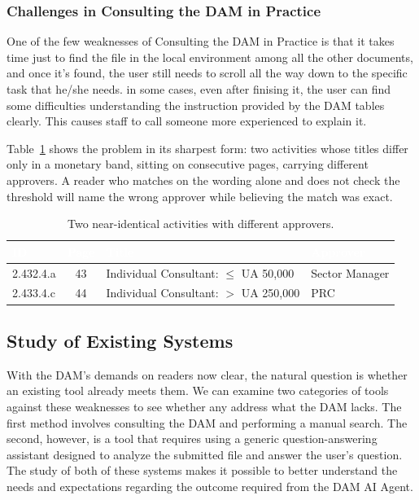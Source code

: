 \subsubsection{Challenges in Consulting the DAM in Practice}

One of the few weaknesses of Consulting the DAM in Practice is that it takes time just to find the file in the local environment among all the other documents, and once it's found, the user still needs to scroll all the way down to the specific task that he/she needs. in some cases, even after finising it, the user can find some difficulties understanding the instruction provided by the DAM tables clearly. This causes staff to call someone more experienced to explain it.

Table~\ref{tab:twintasks} shows the problem in its sharpest form: two activities whose titles differ only in a monetary band, sitting on consecutive pages, carrying different approvers. A reader who matches on the wording alone and does not check the threshold will name the wrong approver while believing the match was exact.

\begin{table}[h]
\centering
\caption{Two near-identical activities with different approvers.}
\label{tab:twintasks}
\begin{tabular}{|l|c|p{}|l|}
\hline
\rowcolor{myblue}
\textcolor{white}{\textbf{ID}} & \textcolor{white}{\textbf{Page}} & \textcolor{white}{\textbf{Title}} & \textcolor{white}{\textbf{Approver}} \\
\hline
2.432.4.a & 43 & Individual Consultant: $\leq$ UA 50,000 & Sector Manager \\
\hline
2.433.4.c & 44 & Individual Consultant: $>$ UA 250,000 & PRC \\
\hline
\end{tabular}
\end{table}


\subsection{Study of Existing Systems}
\label{sec:existingsystems}

With the DAM's demands on readers now clear, the natural question is whether an existing tool already meets them.  We can examine two categories of tools against these weaknesses to see whether any address what the DAM lacks. The first method involves consulting the DAM and performing a manual search. The second, however, is a tool that requires using a generic question-answering assistant designed to analyze the submitted file and answer the user's question. The study of both of these systems makes it possible to better understand the needs and expectations regarding the outcome required from the DAM AI Agent.

